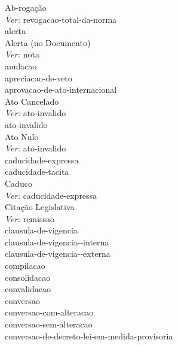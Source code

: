 Ab-rogação \\ 
 \hspace*{1.0cm}\glosshsep \textit{Ver:} \Gls{revogacao-total-da-norma} \\ 
\Gls{alerta} \\ 
Alerta (no Documento) \\ 
 \hspace*{1.0cm}\glosshsep \textit{Ver:} \Gls{nota} \\ 
\Gls{anulacao} \\ 
\Gls{apreciacao-de-veto} \\ 
\Gls{aprovacao-de-ato-internacional} \\ 
Ato Cancelado \\ 
 \hspace*{1.0cm}\glosshsep \textit{Ver:} \Gls{ato-invalido} \\ 
\Gls{ato-invalido} \\ 
Ato Nulo \\ 
 \hspace*{1.0cm}\glosshsep \textit{Ver:} \Gls{ato-invalido} \\ 
\Gls{caducidade-expressa} \\ 
\Gls{caducidade-tacita} \\ 
Caduco \\ 
 \hspace*{1.0cm}\glosshsep \textit{Ver:} \Gls{caducidade-expressa} \\ 
Citação Legislativa \\ 
 \hspace*{1.0cm}\glosshsep \textit{Ver:} \Gls{remissao} \\ 
\Gls{clausula-de-vigencia} \\ 
 \hspace*{1.0cm}\glosshsep \Gls{clausula-de-vigencia--interna} \\ 
 \hspace*{1.0cm}\glosshsep \Gls{clausula-de-vigencia--externa} \\ 
\Gls{compilacao} \\ 
\Gls{consolidacao} \\ 
\Gls{convalidacao} \\ 
\Gls{conversao} \\ 
 \hspace*{1.0cm}\glosshsep \Gls{conversao-com-alteracao} \\ 
 \hspace*{1.0cm}\glosshsep \Gls{conversao-sem-alteracao} \\ 
\Gls{conversao-de-decreto-lei-em-medida-provisoria} \\ 
